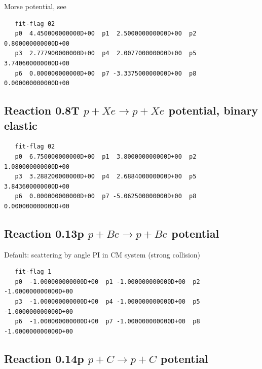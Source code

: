 \documentclass[12pt,dvipdfmx]{article}
\begin{document}
Morse potential, see \cite{kn:Bachmann2}

\begin{small}\begin{verbatim}
   fit-flag 02
   p0  4.450000000000D+00  p1  2.500000000000D+00  p2  0.800000000000D+00
   p3  2.777900000000D+00  p4  2.007700000000D+00  p5  3.740600000000D+00
   p6  0.000000000000D+00  p7 -3.337500000000D+00  p8  0.000000000000D+00
\end{verbatim}\end{small}


\newpage

\subsection{
Reaction 0.8T   $ p + Xe \rightarrow p + Xe $ potential, binary elastic }

\begin{small}\begin{verbatim}
   fit-flag 02
   p0  6.750000000000D+00  p1  3.800000000000D+00  p2  1.080000000000D+00
   p3  3.288200000000D+00  p4  2.688400000000D+00  p5  3.843600000000D+00
   p6  0.000000000000D+00  p7 -5.062500000000D+00  p8  0.000000000000D+00
\end{verbatim}\end{small}


\newpage

\subsection{Reaction 0.13p $ p + Be \rightarrow p + Be $ potential }

Default: scattering by angle PI in CM system (strong collision)

\begin{small}\begin{verbatim}
   fit-flag 1
   p0  -1.000000000000D+00  p1 -1.000000000000D+00  p2 -1.000000000000D+00
   p3  -1.000000000000D+00  p4 -1.000000000000D+00  p5 -1.000000000000D+00
   p6  -1.000000000000D+00  p7 -1.000000000000D+00  p8 -1.000000000000D+00
\end{verbatim}\end{small}


\subsection{Reaction 0.14p $ p + C \rightarrow p + C $ potential }
\end{document}
